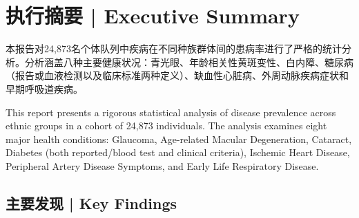 \documentclass[12pt,a4paper]{article}
\begin{document}
\tableofcontents
\newpage

\section{执行摘要 | Executive Summary}

本报告对24,873名个体队列中疾病在不同种族群体间的患病率进行了严格的统计分析。分析涵盖八种主要健康状况：青光眼、年龄相关性黄斑变性、白内障、糖尿病（报告或血液检测以及临床标准两种定义）、缺血性心脏病、外周动脉疾病症状和早期呼吸道疾病。

This report presents a rigorous statistical analysis of disease prevalence across ethnic groups in a cohort of 24,873 individuals. The analysis examines eight major health conditions: Glaucoma, Age-related Macular Degeneration, Cataract, Diabetes (both reported/blood test and clinical criteria), Ischemic Heart Disease, Peripheral Artery Disease Symptoms, and Early Life Respiratory Disease.

\subsection{主要发现 | Key Findings}
\end{document}
